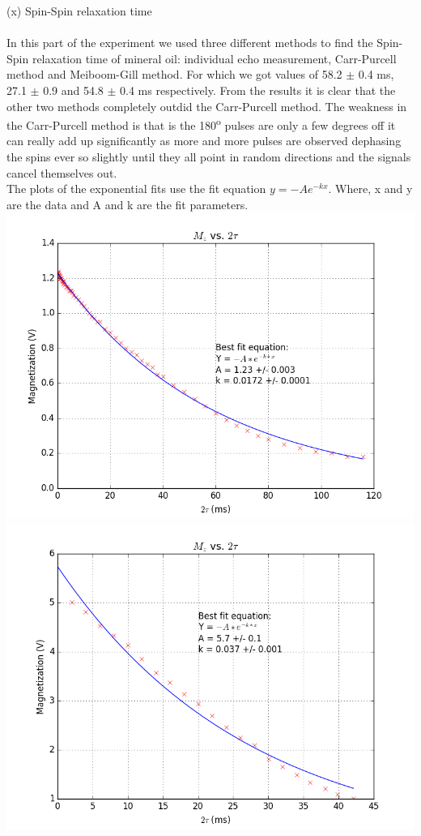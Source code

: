 \documentclass{article}
\begin{document}
{\begin{multicols}{2}
\label{fig:16}
\justify
(x) Spin-Spin relaxation time \\
\\
In this part of the experiment we used three different methods to find the 
Spin-Spin relaxation time of mineral oil: individual echo measurement, 
Carr-Purcell method and Meiboom-Gill method. For which we got values of 58.2 $\pm$ 
0.4 ms, 27.1 $\pm$ 0.9 and 54.8 $\pm$ 0.4 ms respectively. From the results it 
is clear that the other two methods completely outdid the Carr-Purcell method. 
The weakness in the Carr-Purcell method is that is the 180\textsuperscript{o} 
pulses are only a few degrees off it can really add up significantly as more 
and more pulses are observed dephasing the spins ever so slightly until they 
all point in random directions and the signals cancel themselves out.
\\
The plots of the exponential fits use the fit equation $y = -Ae^{-kx}$. Where, 
x and y are the data and A and k are the fit parameters.
\center
\includegraphics[width=\linewidth]{pic-for-report/mineral-water-T2.png}
\label{fig:17}
\includegraphics[width=\linewidth]{pic-for-report/mineral-water-T2-CP.png}

\end{multicols}}
\end{document}
